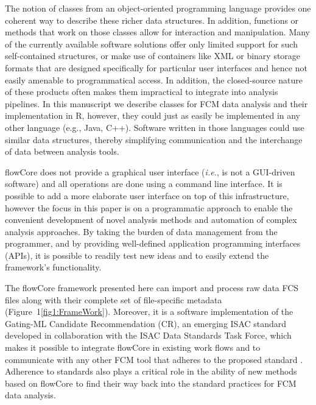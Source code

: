 \documentclass[10pt]{bmc_article}
\newcommand{\Rpackage}[1]{{\textsf{#1}}}
\newenvironment{bmcformat}{\begin{raggedright}\baselineskip20pt\sloppy\setboolean{publ}{false}}{\end{raggedright}\baselineskip20pt\sloppy}
\begin{document}
\begin{bmcformat}
The notion of classes from an object-oriented programming language
provides one coherent way to describe these richer data structures.
In addition, functions or methods that work on those classes allow for
interaction and manipulation. Many of the currently available software
solutions offer only limited support for such self-contained
structures, or make use of containers like XML or binary storage
formats that are designed specifically for particular user interfaces
and hence not easily amenable to programmatical access. In addition,
the closed-source nature of these products often makes them
impractical to integrate into analysis pipelines. In this manuscript
we describe classes for FCM data analysis and their implementation in
R, however, they could just as easily be implemented in any other
language (e.g., Java, C++). Software written in those languages could
use similar data structures, thereby simplifying communication and the
interchange of data between analysis tools.

\Rpackage{flowCore} does not provide a graphical user interface
(\textit{i.e.}, is not a GUI-driven software) and all operations are
done using a command line interface.  It is possible to add a more
elaborate user interface on top of this infrastructure, however the
focus in this paper is on a programmatic approach to enable the
convenient development of novel analysis methods and automation of
complex analysis approaches.  By taking the burden of data management
from the programmer, and by providing well-defined application
programming interfaces (APIs), it is possible to readily test new
ideas and to easily extend the framework's functionality.

The \Rpackage{flowCore} framework presented here can import and
process raw data FCS files along with their complete set of
file-specific metadata (Figure~1\ref{fig1:FrameWork}). Moreover, it is
a software implementation of the Gating-ML Candidate Recommendation
(CR), an emerging ISAC standard developed in collaboration with the
ISAC Data Standards Task Force, which makes it possible to integrate
\Rpackage{flowCore} in existing work flows and to communicate with any
other FCM tool that adheres to the proposed standard
\cite{SpidlenInPressCytometryA}. Adherence to standards also plays a
critical role in the ability of new methods based on
\Rpackage{flowCore} to find their way back into the standard practices
for FCM data analysis.



\end{bmcformat}
\end{document}
